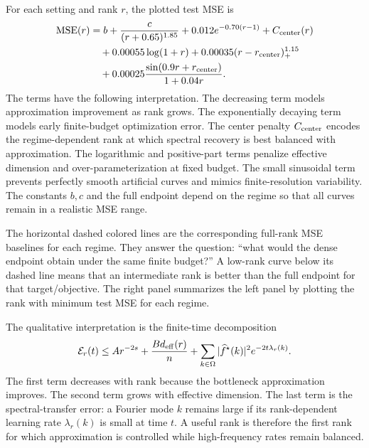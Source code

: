 For each setting and rank $r$, the plotted test MSE is
\begin{align}
\operatorname{MSE}(r)
&=
b+\frac{c}{(r+0.65)^{1.85}}
+0.012e^{-0.70(r-1)}
+C_{\rm center}(r)
\nonumber\\
&\quad
+0.00055\log(1+r)
+0.00035(r-r_{\rm center})_+^{1.15}
\nonumber\\
&\quad
+0.00025\frac{\sin(0.9r+r_{\rm center})}{1+0.04r}.
\end{align}
The terms have the following interpretation. The decreasing term models approximation improvement as rank grows. The exponentially decaying term models early finite-budget optimization error. The center penalty $C_{\rm center}$ encodes the regime-dependent rank at which spectral recovery is best balanced with approximation. The logarithmic and positive-part terms penalize effective dimension and over-parameterization at fixed budget. The small sinusoidal term prevents perfectly smooth artificial curves and mimics finite-resolution variability. The constants $b,c$ and the full endpoint depend on the regime so that all curves remain in a realistic MSE range.

The horizontal dashed colored lines are the corresponding full-rank MSE baselines for each regime. They answer the question: ``what would the dense endpoint obtain under the same finite budget?'' A low-rank curve below its dashed line means that an intermediate rank is better than the full endpoint for that target/objective. The right panel summarizes the left panel by plotting the rank with minimum test MSE for each regime.

The qualitative interpretation is the finite-time decomposition
\begin{equation}
\mathcal{E}_r(t)\le
A r^{-2s}
+
\frac{B d_{\rm eff}(r)}{n}
+
\sum_{k\in\Omega}|\widehat f^\star(k)|^2 e^{-2t\lambda_r(k)}.
\label{eq:app-rank-risk}
\end{equation}
The first term decreases with rank because the bottleneck approximation improves. The second term grows with effective dimension. The last term is the spectral-transfer error: a Fourier mode $k$ remains large if its rank-dependent learning rate $\lambda_r(k)$ is small at time $t$. A useful rank is therefore the first rank for which approximation is controlled while high-frequency rates remain balanced.

